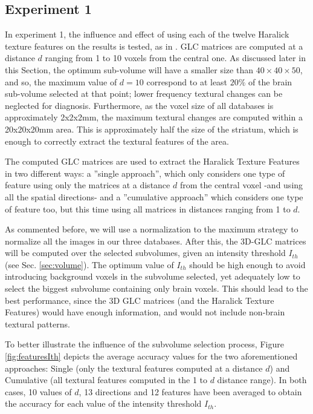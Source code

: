 \subsection{Experiment 1}
In experiment 1, the influence and effect of using each of the twelve Haralick texture features on the results is tested, as in \cite{martinez2013texture}. GLC matrices are computed at a distance $d$ ranging from 1 to 10 voxels from the central one. As discussed later in this Section, the optimum sub-volume will have a smaller size than $40\times40\times50$, and so, the maximum value of $d=10$ correspond to at least $20\%$ of the brain sub-volume selected at that point; lower frequency textural changes can be neglected for diagnosis. Furthermore, as the voxel size of all databases is approximately 2x2x2mm, the maximum textural changes are computed within a 20x20x20mm area. This is approximately half the size of the striatum, which is enough to correctly extract the textural features of the area. 

The computed GLC matrices are used to extract the Haralick Texture Features in two different ways: a ''single approach'', which only considers one type of feature using only the matrices at a distance $d$ from the central voxel -and using all the spatial directions- and a ''cumulative approach'' which considers one type of feature too, but this time using all matrices in distances ranging from 1 to $d$. 

As commented before, we will use a normalization to the maximum strategy to normalize all the images in our three databases. After this, the 3D-GLC matrices will be computed over the selected subvolumes, given an intensity threshold $I_{th}$ (see Sec. \ref{sec:volume}). The optimum value of $I_{th}$ should be high enough to avoid introducing background voxels in the subvolume selected, yet adequately low to select the biggest subvolume containing only brain voxels. This should lead to the best performance, since the 3D GLC matrices (and the Haralick Texture Features) would have enough information, and would not include non-brain textural patterns. 

To better illustrate the influence of the subvolume selection process, Figure \ref{fig:featuresIth} depicts the average accuracy values for the two aforementioned approaches: Single (only the textural features computed at a distance $d$) and Cumulative (all textural features computed in the 1 to $d$ distance range). In both cases, 10 values of $d$, 13 directions and 12 features have been averaged to obtain the accuracy for each value of the intensity threshold $I_{th}$. 


